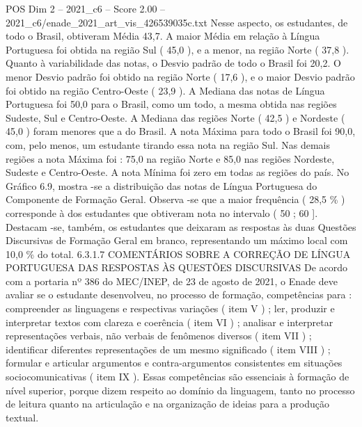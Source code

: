 \begin{textsample}{POS Dim 2 – 2021\_c6 – Score 2.00 – 2021\_c6/enade\_2021\_art\_vis\_426539035c.txt}
Nesse aspecto, os estudantes, de todo o Brasil, obtiveram Média 43,7.
A maior Média em relação à Língua Portuguesa foi obtida na região Sul ( 45,0 ), e a menor, na região Norte ( 37,8 ).
Quanto à variabilidade das notas, o Desvio padrão de todo o Brasil foi 20,2.
O menor Desvio padrão foi obtido na região Norte ( 17,6 ), e o maior Desvio padrão foi obtido na região Centro-Oeste ( 23,9 ).
A Mediana das notas de Língua Portuguesa foi 50,0 para o Brasil, como um todo, a mesma obtida nas regiões Sudeste, Sul e Centro-Oeste.
A Mediana das regiões Norte ( 42,5 ) e Nordeste ( 45,0 ) foram menores que a do Brasil.
A nota Máxima para todo o Brasil foi 90,0, com, pelo menos, um estudante tirando essa nota na região Sul.
Nas demais regiões a nota Máxima foi : 75,0 na região Norte e 85,0 nas regiões Nordeste, Sudeste e Centro-Oeste.
A nota Mínima foi zero em todas as regiões do país.
No Gráfico 6.9, mostra -se a distribuição das notas de Língua Portuguesa do Componente de Formação Geral.
Observa -se que a maior frequência ( 28,5 \% ) corresponde à dos estudantes que obtiveram nota no intervalo ( 50 ; 60 ].
Destacam -se, também, os estudantes que deixaram as respostas às duas Questões Discursivas de Formação Geral em branco, representando um máximo local com 10,0 \% do total. 6.3.1.7 COMENTÁRIOS SOBRE A CORREÇÃO DE LÍNGUA PORTUGUESA DAS RESPOSTAS ÀS QUESTÕES DISCURSIVAS De acordo com a portaria nº 386 do MEC/INEP, de 23 de agosto de 2021, o Enade deve avaliar se o estudante desenvolveu, no processo de formação, competências para : compreender as linguagens e respectivas variações ( item V ) ; ler, produzir e interpretar textos com clareza e coerência ( item VI ) ; analisar e interpretar representações verbais, não verbais de fenômenos diversos ( item VII ) ; identificar diferentes representações de um mesmo significado ( item VIII ) ; formular e articular argumentos e contra-argumentos consistentes em situações sociocomunicativas ( item IX ).
Essas competências são essenciais à formação de nível superior, porque dizem respeito ao domínio da linguagem, tanto no processo de leitura quanto na articulação e na organização de ideias para a produção textual.

\end{textsample}
